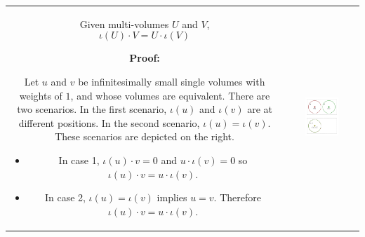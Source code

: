 \begin{tabular}{cc}
\parbox{0.5\textwidth}{
\begin{thm}\label{thm:point-volume_intersection_duality}
Given multi-volumes \(U\) and \(V\), 
\[\iota(U) \cdot V = U \cdot \iota(V)\]
\end{thm}
\textbf{Proof:}

Let \(u\) and \(v\) be infinitesimally small single volumes with weights of \(1\), and whose volumes are equivalent. There are two scenarios. In the first scenario, \(\iota(u)\) and \(\iota(v)\) are at different positions. In the second scenario, \(\iota(u) = \iota(v)\). These scenarios are depicted on the right.

\begin{itemize}
\item In case 1, \(\iota(u) \cdot v = 0\) and \(u \cdot \iota(v) = 0\) so \(\iota(u) \cdot v = u \cdot \iota(v)\). 
\item In case 2, \(\iota(u) = \iota(v)\) implies \(u = v\). Therefore \(\iota(u) \cdot v = u \cdot \iota(v)\).  
\end{itemize}
} & \parbox{0.5\textwidth}{
\includegraphics[width = 0.5\textwidth]{Duality/point_volume_duality_intersection}
}
\end{tabular}

